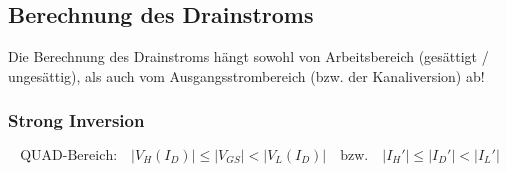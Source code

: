 


    








\subsection{Berechnung des Drainstroms}

Die Berechnung des Drainstroms hängt sowohl von Arbeitsbereich (gesättigt / ungesättig), als auch vom Ausgangsstrombereich (bzw. der Kanaliversion) ab!


\subsubsection{Strong Inversion}
\label{Strong Inversion}

\vspace{-0.3cm}

\[ \boxed{ \text{QUAD-Bereich:} \quad |V_H(I_D)| \leq |V_{GS}| < |V_L(I_D)| \quad \text{bzw.} \quad |I_H'| \leq |I_D'| < |I_L'| } \]  %

